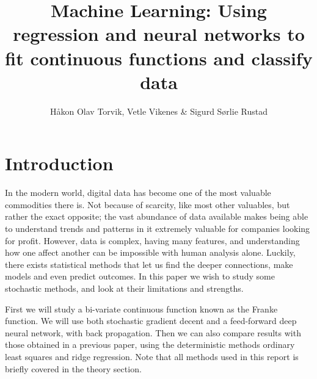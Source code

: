 \documentclass[12pt]{extarticle}
\author{\Large Håkon Olav Torvik, Vetle Vikenes \& Sigurd Sørlie Rustad}
\title{\Huge Machine Learning: Using regression and neural networks to fit continuous functions and classify data}
\affiliation{\large FYS-STK4155 – Applied Data Analysis and Machine Learning
\\Autumn 2021\\Department of Physics\\University of Oslo\\\\\today}
\begin{document}
\maketitle
\pagestyle{myplain}









\section{Introduction}
In the modern world, digital data has become one of the most valuable commodities there is. Not because of scarcity, like most other valuables, but rather the exact opposite; the vast abundance of data available makes being able to understand trends and patterns in it extremely valuable for companies looking for profit. However, data is complex, having many features, and understanding how one affect another can be impossible with human analysis alone. Luckily, there exists statistical methods that let us find the deeper connections, make models and even predict outcomes. In this paper we wish to study some stochastic methods, and look at their limitations and strengths.

First we will study a bi-variate continuous function known as the Franke function. We will use both stochastic gradient decent and a feed-forward deep neural network, with back propagation. Then we can also compare results with those obtained in a previous paper, using the deterministic methods ordinary least squares and ridge regression. Note that all methods used in this report is briefly covered in the theory section.
\end{document}
